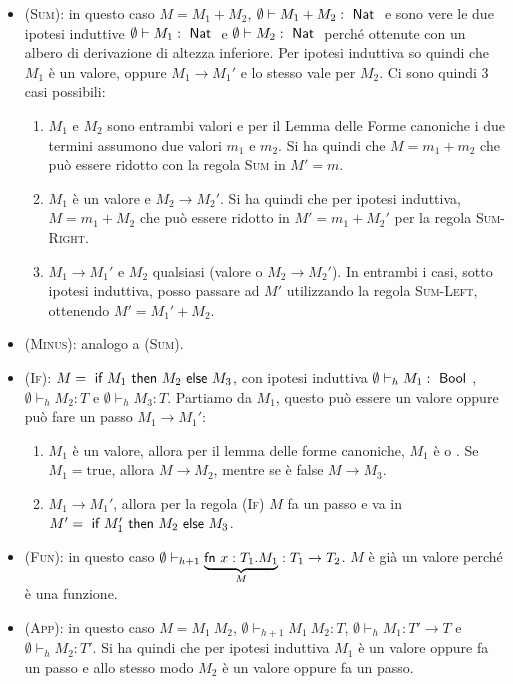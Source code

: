 \begin{itemize}
	\item \textsc{(Sum)}: in questo caso $M = M_1 +M_2$, $\emptyset \vdash M_1 + M_2 : \Nat$ e sono vere le due ipotesi induttive $\emptyset \vdash M_1 : \Nat$ e $\emptyset \vdash M_2 : \Nat$ perché ottenute con un albero di derivazione di altezza inferiore.
	Per ipotesi induttiva so quindi che $M_1$ è un valore, oppure $M_1 \rightarrow M_1'$ e lo stesso vale per $M_2$.
	Ci sono quindi 3 casi possibili:
	\begin{enumerate}[a]
		\item $M_1$ e $M_2$ sono entrambi valori e per il Lemma delle Forme canoniche i due termini assumono due valori $m_1$ e $m_2$. Si ha quindi che $M = m_1 + m_2$ che può essere ridotto con la regola \textsc{Sum} in $M' = m$.
		\item $M_1$ è un valore e $M_2 \rightarrow M_2'$. Si ha quindi che per ipotesi induttiva, $M = m_1 + M_2$ che può essere ridotto in $M' = m_1 + M_2'$ per la regola \textsc{Sum-Right}.
		\item $M_1 \rightarrow M_1'$ e $M_2$ qualsiasi (valore o $M_2 \rightarrow M_2'$). In entrambi i casi, sotto ipotesi induttiva, posso passare ad $M'$ utilizzando la regola \textsc{Sum-Left}, ottenendo $M' = M_1' + M_2$. 
	\end{enumerate}
	\item \textsc{(Minus)}: analogo a \textsc{(Sum)}.
	\item \textsc{(If)}: $ M = \iif M_1 \then M_2 \eelse M_3$, con ipotesi induttiva $\emptyset \vdash_h M_1 : \Bool$, $\emptyset \vdash_h M_2 : T$ e $\emptyset \vdash_h M_3 : T$. 
	Partiamo da $M_1$, questo può essere un valore oppure può fare un passo $M_1 \rightarrow M_1'$:
	\begin{enumerate}[a]
		\item $M_1$ è un valore, allora per il lemma delle forme canoniche, $M_1$ è  o . Se $M_1 = \text{true}$, allora $M \rightarrow M_2$, mentre se è false $M \rightarrow M_3$.
		\item $M_1 \rightarrow M_1'$, allora per la regola \textsc{(If)} $M$ fa un passo e va in $M' = \iif M_1' \then M_2 \eelse M_3$.
	\end{enumerate}
	\item \textsc{(Fun)}: in questo caso $\emptyset \vdash_{h+1} \underbrace{\fn x: T_1 . M_1}_{M} : T_1 \rightarrow T_2$. $M$ è già un valore perché è una funzione.
	\item \textsc{(App)}: in questo caso $M = M_1 \: M_2$, $\emptyset \vdash_{h+1} M_1 \: M_2 : T$, $\emptyset\vdash_{h} M_1 : T'\rightarrow T $ e $\emptyset\vdash_h M_2 : T'$. Si ha quindi che per ipotesi induttiva $M_1$ è un valore oppure fa un passo e allo stesso modo $M_2$ è un valore oppure fa un passo.

\end{itemize}
